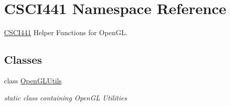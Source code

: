 \hypertarget{namespace_c_s_c_i441}{}\section{C\+S\+C\+I441 Namespace Reference}
\label{namespace_c_s_c_i441}


\hyperlink{namespace_c_s_c_i441}{C\+S\+C\+I441} Helper Functions for Open\+GL.  


\subsection*{Classes}
\begin{DoxyCompactItemize}
\item 
class \hyperlink{class_c_s_c_i441_1_1_open_g_l_utils}{Open\+G\+L\+Utils}
\begin{DoxyCompactList}\small\item\em static class containing Open\+GL Utilities \end{DoxyCompactList}\end{DoxyCompactItemize}
